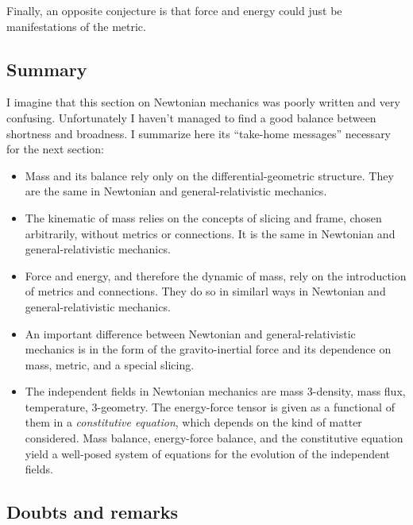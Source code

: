 \documentclass[\ifafour a4paper,12pt,\else a5paper,10pt,\fi%
onecolumn,oneside,article,%
british%
]{memoir}
\theoremstyle{remark}
\theoremstyle{innote}
\newcommand*{\citep}{\footcites}%
\renewcommand*{\|}{\nonscript\,\vert\nonscript\;\mathopen{}}
\begin{document}
Finally, an opposite conjecture is that force and energy could just be
manifestations of the metric.

\subsection{Summary}
\label{sec:summary_newtonian}

I imagine that this section on Newtonian mechanics was poorly written and
very confusing. Unfortunately I haven't managed to find a good balance
between shortness and broadness. I summarize here its \enquote{take-home
  messages} necessary for the next section:
\begin{itemize}
\item Mass and its balance rely only on the differential-geometric
  structure. They are the same in Newtonian and general-relativistic
  mechanics.
\item The kinematic of mass relies on the concepts of slicing and frame,
  chosen arbitrarily, without metrics or connections. It is the same in
  Newtonian and general-relativistic mechanics.
\item Force and energy, and therefore the dynamic of mass, rely on the
  introduction of metrics and connections. They do so in similarl ways in
  Newtonian and general-relativistic mechanics.
\item An important difference between Newtonian and general-relativistic
  mechanics is in the form of the gravito-inertial force and its dependence
  on mass, metric, and a special slicing.
\item The independent fields in Newtonian mechanics are mass 3-density,
  mass flux, temperature, 3-geometry. The energy-force tensor is given as a
  functional of them in a \emph{constitutive equation}, which depends on
  the kind of matter considered. Mass balance, energy-force balance, and
  the constitutive equation yield a well-posed system of equations for the
  evolution of the independent fields.
\end{itemize}







\subsection{Doubts and remarks}
\label{sec:doubts_remarks}
\end{document}
